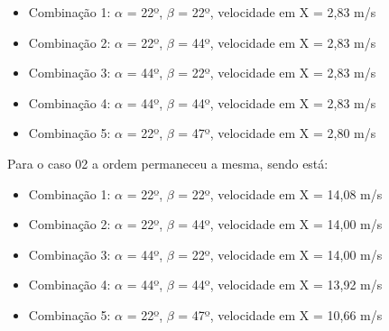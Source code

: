 \documentclass[deposito, acronym, symbols]{fei}
\begin{document}
\begin{itemize}
    \item Combinação 1: $\alpha$ = 22º, $\beta$ = 22º, velocidade em X = 2,83 m/s
    \item Combinação 2: $\alpha$ = 22º, $\beta$ = 44º, velocidade em X = 2,83 m/s
    \item Combinação 3: $\alpha$ = 44º, $\beta$ = 22º, velocidade em X = 2,83 m/s
    \item Combinação 4: $\alpha$ = 44º, $\beta$ = 44º, velocidade em X = 2,83 m/s
    \item Combinação 5: $\alpha$ = 22º, $\beta$ = 47º, velocidade em X = 2,80 m/s
\end{itemize}

 Para o caso 02 a ordem permaneceu a mesma, sendo está:

\begin{itemize}
    \item Combinação 1: $\alpha$ = 22º, $\beta$ = 22º, velocidade em X = 14,08 m/s
    \item Combinação 2: $\alpha$ = 22º, $\beta$ = 44º, velocidade em X = 14,00 m/s
    \item Combinação 3: $\alpha$ = 44º, $\beta$ = 22º, velocidade em X = 14,00 m/s
    \item Combinação 4: $\alpha$ = 44º, $\beta$ = 44º, velocidade em X = 13,92 m/s
    \item Combinação 5: $\alpha$ = 22º, $\beta$ = 47º, velocidade em X = 10,66 m/s
\end{itemize}
\end{document}
